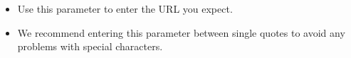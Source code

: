 
\begin{itemize}
\item Use this parameter to enter the URL you expect. 
\item We recommend entering this parameter between single quotes  to avoid any problems with special characters. 
\end{itemize}

